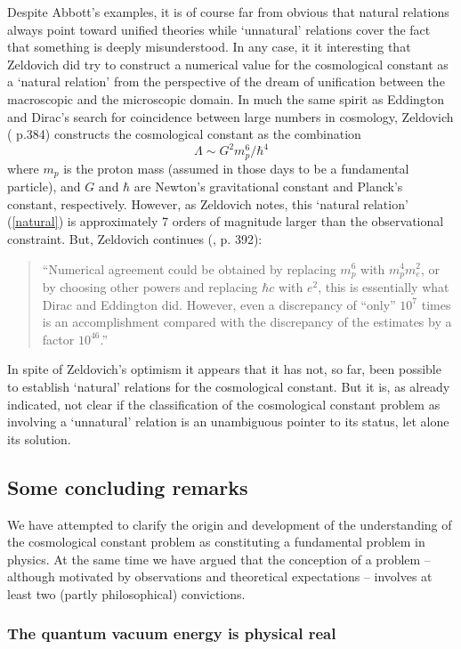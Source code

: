 \documentclass[12pt]{article}
\newcommand{\beq}{\begin{equation}}
\newcommand{\eeq}{\end{equation}}
\def\ss{\subsection}
\def\sss{\subsubsection}
\begin{document}
Despite Abbott's examples, it is of course far from obvious that
natural relations always point toward unified theories while
`unnatural' relations cover the fact that something is deeply
misunderstood. In any case, it it interesting that Zeldovich 
did try to construct a numerical value for the cosmological constant
as a `natural relation' from the perspective of the dream of
unification between the macroscopic and the microscopic domain. In
much the same spirit as Eddington and Dirac's search for
coincidence between large numbers in cosmology, Zeldovich
(\cite{zeldovich68} p.384) constructs the cosmological constant as
the combination
\beq 
\label{natural}
\Lambda \sim G^2 m_p^6/ \hbar^4
\eeq
where $m_p$ is the proton mass (assumed in those
days to be a fundamental particle), and $G$ and $\hbar$ are
Newton's gravitational constant and Planck's constant, respectively.
However, as Zeldovich notes, this `natural relation' (\ref{natural})
is approximately 7 orders of magnitude larger than the
observational constraint. But, Zeldovich continues (\cite{zeldovich68}, 
p. 392):
\begin{quote}
``Numerical agreement could be obtained by replacing $m_p^6$
with $m_p^4 m_e^2$, or by choosing other
powers and replacing $\hbar c$ with $e^2$, this is
essentially what Dirac and Eddington did. However, even
a discrepancy of ``only'' $10^7$ times is an accomplishment
compared with the discrepancy of the estimates by a
factor $10^{46}$.''
\end{quote}
In spite of Zeldovich's optimism it appears that it has not, so
far, been possible to establish `natural' relations for the
cosmological constant. But it is, as already indicated, not
clear if the classification of the cosmological constant problem
as involving a `unnatural' relation is an unambiguous pointer to
its status, let alone its solution.


\ss{Some concluding remarks} 

We have attempted to clarify the origin and development of the
understanding of the cosmological constant problem as constituting a
fundamental problem in physics. At the same time we have argued that
the conception of a problem -- although motivated by observations and
theoretical expectations -- involves at least two (partly
philosophical) convictions.

\sss{The quantum vacuum energy is physical real}
\end{document}
